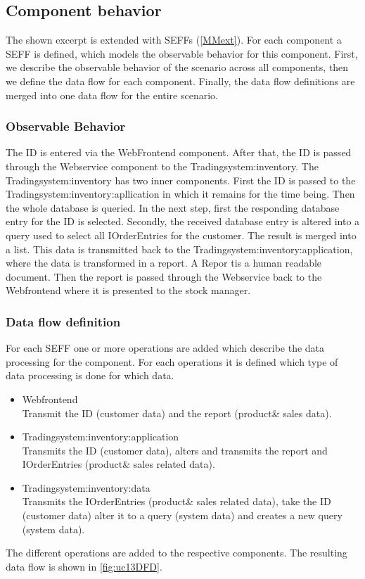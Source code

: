 \subsection{Component behavior}
The shown excerpt is extended with SEFFs (\autoref{MMext}). For each component a SEFF is defined, which models the observable behavior for this component. First, we describe the observable behavior of the scenario across all components, then we define the data flow for each component. Finally, the data flow definitions are merged into one data flow for the entire scenario.
\subsubsection{Observable Behavior}
The ID is entered via the WebFrontend component. After that, the ID is passed through the Webservice component to the Tradingsystem:inventory. The Tradingsystem:inventory has two inner components. First the ID is passed to the Tradingsystem:inventory:apllication in which it remains for the time being. Then the whole database is queried. In the next step, first the responding database entry for the ID is selected. Secondly, the received database entry is altered into a query used to select all IOrderEntries for the customer. The result is merged into a list. This data is transmitted back to the Tradingsystem:inventory:application, where the data is transformed in a report. A Repor tis a human readable document. Then the report is passed through the Webservice back to the Webfrontend where it is presented to the stock manager.
\subsubsection{Data flow definition}
For each SEFF one or more operations are added which describe the data processing for the component. For each operations it is defined which type of data processing is done for which data.
\begin{itemize}
\item Webfrontend \\ Transmit the ID (customer data) and the report (product\& sales data).
\item Tradingsystem:inventory:application \\ Transmits the ID (customer data), alters and transmits the report and IOrderEntries (product\& sales related data).
\item Tradingsystem:inventory:data \\ Transmits the IOrderEntries (product\& sales related data), take the ID (customer data) alter it to a query (system data) and creates a new query (system data).
\end{itemize}
The different operations are added to the respective components. The resulting data flow is shown in \autoref{fig:uc13DFD}.


